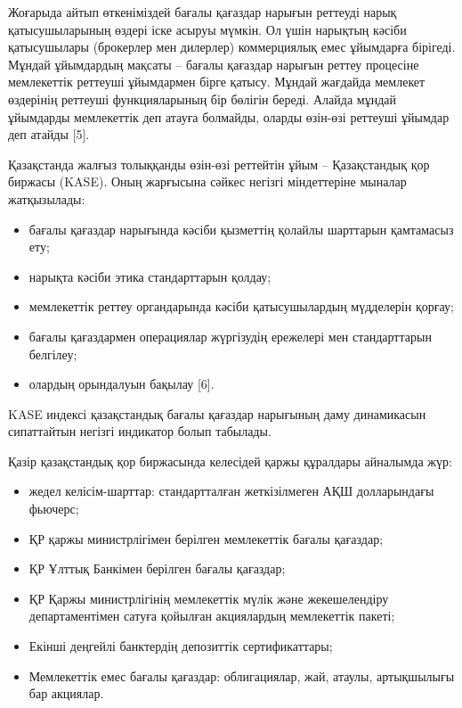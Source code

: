 Жоғарыда айтып өткеніміздей бағалы қағаздар нарығын реттеуді нарық
қатысушыларының өздері іске асыруы мүмкін. Ол үшін нарықтың кәсіби
қатысушылары (брокерлер мен дилерлер) коммерциялық емес ұйымдарға
бірігеді. Мұндай ұйымдардың мақсаты -- бағалы қағаздар нарығын реттеу
процесіне мемлекеттік реттеуші ұйымдармен бірге қатысу. Мұндай жағдайда
мемлекет өздерінің реттеуші функцияларының бір бөлігін береді. Алайда
мұндай ұйымдарды мемлекеттік деп атауға болмайды, оларды өзін-өзі
реттеуші ұйымдар деп атайды {[}5{]}.

Қазақстанда жалғыз толыққанды өзін-өзі реттейтін ұйым -- Қазақстандық
қор биржасы (KASE). Оның жарғысына сәйкес негізгі міндеттеріне мыналар
жатқызылады:

\begin{itemize}
\item
  бағалы қағаздар нарығында кәсіби қызметтің қолайлы шарттарын
  қамтамасыз ету;
\item
  нарықта кәсіби этика стандарттарын қолдау;
\item
  мемлекеттік реттеу органдарында кәсіби қатысушылардың мүдделерін
  қорғау;
\item
  бағалы қағаздармен операциялар жүргізудің ережелері мен стандарттарын
  белгілеу;
\item
  олардың орындалуын бақылау {[}6{]}.
\end{itemize}

KASE индексі қазақстандық бағалы қағаздар нарығының даму динамикасын
сипаттайтын негізгі индикатор болып табылады.

Қазір қазақстандық қор биржасында келесідей қаржы құралдары айналымда
жүр:

\begin{itemize}
\item
  жедел келісім-шарттар: стандартталған жеткізілмеген АҚШ долларындағы
  фьючерс;
\item
  ҚР қаржы министрлігімен берілген мемлекеттік бағалы қағаздар;
\item
  ҚР Ұлттық Банкімен берілген бағалы қағаздар;
\item
  ҚР Қаржы министрлігінің мемлекеттік мүлік және жекешелендіру
  департаментімен сатуға қойылған акциялардың мемлекеттік пакеті;
\item
  Екінші деңгейлі банктердің депозиттік сертификаттары;
\item
  Мемлекеттік емес бағалы қағаздар: облигациялар, жай, атаулы,
  артықшылығы бар акциялар.
\end{itemize}

